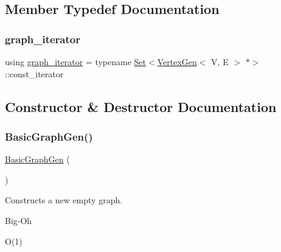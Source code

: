 \subsection{Member Typedef Documentation}
\mbox{\label{classGraph_a695969c31e87f9e8319d74e5ca39024b}} 
\subsubsection{\texorpdfstring{graph\+\_\+iterator}{graph\_iterator}}
{\footnotesize\ttfamily using \mbox{\hyperlink{classGraph_a695969c31e87f9e8319d74e5ca39024b}{graph\+\_\+iterator}} =  typename \mbox{\hyperlink{classstanfordcpplib_1_1collections_1_1GenericSet}{Set}}$<$\mbox{\hyperlink{classVertexGen}{Vertex\+Gen}}$<$ V, E $>$  $\ast$$>$\+::const\+\_\+iterator\hspace{0.3cm}{\ttfamily [inherited]}}



\subsection{Constructor \& Destructor Documentation}
\mbox{\label{classBasicGraphGen_a9d6eaee0a2e8ea6de432f815463813fa}} 
\subsubsection{\texorpdfstring{Basic\+Graph\+Gen()}{BasicGraphGen()}\hspace{0.1cm}{\footnotesize\ttfamily [1/2]}}
{\footnotesize\ttfamily \mbox{\hyperlink{classBasicGraphGen}{Basic\+Graph\+Gen}} (\begin{DoxyParamCaption}{ }\end{DoxyParamCaption})}



Constructs a new empty graph. 

\begin{DoxyRefDesc}{Big-\/\+Oh}
\item[\mbox{\hyperlink{BigOh__BigOh000001}{Big-\/\+Oh}}]O(1) \end{DoxyRefDesc}
\mbox{\label{classBasicGraphGen_aa8af075f69d803e4a813e4d348150fc5}} 
